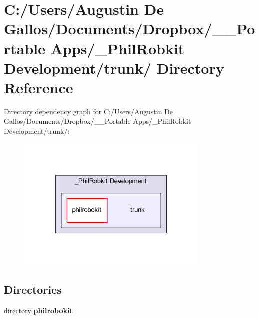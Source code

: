 \section{C\-:/\-Users/\-Augustin De Gallos/\-Documents/\-Dropbox/\-\_\-\-\_\-\-Portable Apps/\-\_\-\-Phil\-Robkit Development/trunk/ Directory Reference}
\label{dir_71eb706c380d5a5bb44d1c52555eb092}
Directory dependency graph for C\-:/\-Users/\-Augustin De Gallos/\-Documents/\-Dropbox/\-\_\-\-\_\-\-Portable Apps/\-\_\-\-Phil\-Robkit Development/trunk/\-:\nopagebreak
\begin{figure}[H]
\begin{center}
\leavevmode
\includegraphics[width=262pt]{dir_71eb706c380d5a5bb44d1c52555eb092_dep}
\end{center}
\end{figure}
\subsection*{Directories}
\begin{DoxyCompactItemize}
\item 
directory {\bf philrobokit}
\end{DoxyCompactItemize}

